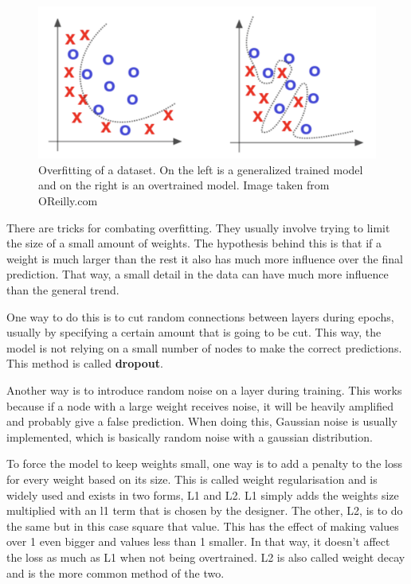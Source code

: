 \begin{figure}[hbtp]
\begin{center}
\includegraphics[width = 1.0\textwidth]{./Images/overfitting.jpg} 
\caption{Overfitting of a dataset. On the left is a generalized trained model and on the right is an overtrained model. Image taken from OReilly.com \cite{overfitting}}
\label{fig:overfitting}
\end{center}
\end{figure}

There are tricks for combating overfitting. They usually involve trying to limit the size of a small amount of weights.
The hypothesis behind this is that if a weight is much larger than the rest it also has much more influence over the final prediction. That way, a small detail in the data can have much more influence than the general trend.

One way to do this is to cut random connections between layers during epochs, usually by specifying a certain amount that is going to be cut.
This way, the model is not relying on a small number of nodes to make the correct predictions. This method is called \textbf{dropout}.

Another way is to introduce random noise on a layer during training. This works because if a node with a large weight receives noise, it will be heavily amplified and probably give a false prediction.
When doing this, Gaussian noise is usually implemented, which is basically random noise with a gaussian distribution.

To force the model to keep weights small, one way is to add a penalty to the loss for every weight based on its size. 
This is called weight regularisation and is widely used and exists in two forms, L1 and L2.
L1 simply adds the weights size multiplied with an l1 term that is chosen by the designer.
The other, L2, is to do the same but in this case square that value. This has the effect of making values over 1 even bigger and values less than 1 smaller.
In that way, it doesn't affect the loss as much as L1 when not being overtrained. L2 is also called weight decay and is the more common method of the two.

